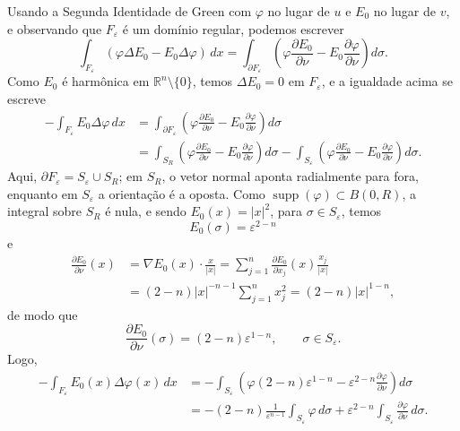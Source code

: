 \documentclass[../distribution_theory_notes.tex]{subfiles}
\begin{document}
Usando a Segunda Identidade de Green com \(\varphi\) no lugar de \(u\) e \(E_{0}\) no lugar de \(v\), e observando que \(F_{\varepsilon}\) é um domínio regular, podemos escrever
\[
	\int_{F_{\varepsilon}}(\varphi\Delta E_{0}-E_{0}\Delta\varphi)\,dx
	=
	\int_{\partial F_{\varepsilon}}
	\left(
	\varphi\frac{\partial E_{0}}{\partial\nu}
	-E_{0}\frac{\partial\varphi}{\partial\nu}
	\right)d\sigma.
\]
Como \(E_{0}\) é harmônica em \(\mathbb{R}^{n}\setminus\{0\}\), temos \(\Delta E_{0}=0\) em \(F_{\varepsilon}\), e a igualdade acima se escreve
\begin{align*}
	-	\int_{F_{\varepsilon}}E_{0}\Delta\varphi\,dx
	 & =\int_{\partial F_{\varepsilon}}
	\left(
	\varphi\frac{\partial E_{0}}{\partial\nu}
	-E_{0}\frac{\partial\varphi}{\partial\nu}
	\right)d\sigma                      \\
	 & =\int_{S_{R}}
	\left(
	\varphi\frac{\partial E_{0}}{\partial\nu}
	-E_{0}\frac{\partial\varphi}{\partial\nu}
	\right)d\sigma
	-
	\int_{S_{\varepsilon}}
	\left(
	\varphi\frac{\partial E_{0}}{\partial\nu}
	-E_{0}\frac{\partial\varphi}{\partial\nu}
	\right)d\sigma.
\end{align*}
Aqui, \(\partial F_{\varepsilon}=S_{\varepsilon}\cup S_{R}\); em \(S_{R}\), o vetor normal aponta radialmente para fora, enquanto em \(S_{\varepsilon}\) a orientação é a oposta. Como \(\operatorname{supp}(\varphi)\subset B(0,R)\), a integral sobre \(S_{R}\) é nula, e sendo \(E_{0}(x)=| x |^{2}\), para \(\sigma\in S_{\varepsilon}\), temos
\[
	E_{0}(\sigma)=\varepsilon^{2-n}
\]
e
\begin{align*}
	\frac{\partial E_{0}}{\partial\nu}(x)
	 & =\nabla E_{0}(x)\cdot\frac{x}{|x|}
	=\sum\limits_{j=1}^{n}\frac{\partial E_{0}}{\partial x_{j}}(x)\frac{x_{j}}{|x|} \\
	 & =(2-n)|x|^{-n-1}\sum\limits_{j=1}^{n}x_{j}^{2}
	=(2-n)|x|^{1-n},
\end{align*}
de modo que
\[
	\frac{\partial E_{0}}{\partial\nu}(\sigma)
	=(2-n)\varepsilon^{1-n},
	\qquad \sigma\in S_{\varepsilon}.
\]
Logo,
\begin{align*}
	-	\int_{F_{\varepsilon}}E_{0}(x)\Delta\varphi(x)\,dx
	 & =-\int_{S_{\varepsilon}}
	\left(
	\varphi(2-n)\varepsilon^{1-n}
	-\varepsilon^{2-n}\frac{\partial\varphi}{\partial\nu}
	\right)d\sigma                                                              \\
	 & =-(2-n)\frac{1}{\varepsilon^{n-1}}\int_{S_{\varepsilon}}\varphi\,d\sigma
	+\varepsilon^{2-n}\int_{S_{\varepsilon}}\frac{\partial\varphi}{\partial\nu}\,d\sigma.
\end{align*}
\end{document}
